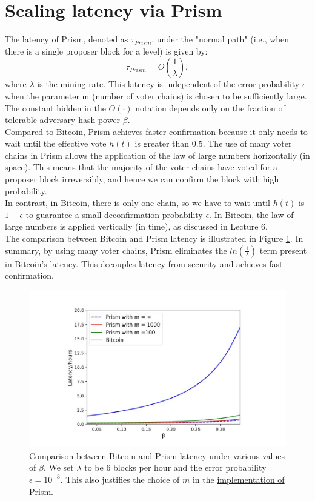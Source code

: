 \documentclass{report}
\begin{document}
\section{Scaling latency via Prism}
The latency of Prism, denoted as $\tau_{Prism}$, under the "normal path" (i.e., when there is a single proposer block for a level) is given by:\\
\begin{equation*}
	\tau_{Prism} = O(\frac{1}{\lambda}),
\end{equation*}
where $\lambda$ is the mining rate. This latency is independent of the error probability $\epsilon$ when the parameter m (number of voter chains) is chosen to be sufficiently large. The constant hidden in the $O(·)$ notation depends only on the fraction of tolerable adversary hash power $\beta$.\\
Compared to Bitcoin, Prism achieves faster confirmation because it only needs to wait until the effective vote $h(t)$ is greater than $0.5$. The use of many voter chains in Prism allows the application of the law of large numbers horizontally (in space). This means that the majority of the voter chains have voted for a proposer block irreversibly, and hence we can confirm the block with high probability.\\
In contrast, in Bitcoin, there is only one chain, so we have to wait until $h(t)$ is $1 - \epsilon$ to guarantee a small deconfirmation probability $\epsilon$. In Bitcoin, the law of large numbers is applied vertically (in time), as discussed in Lecture 6.\\
The comparison between Bitcoin and Prism latency is illustrated in Figure \ref{fig:f6}. In summary, by using many voter chains, Prism eliminates the $ln(\frac{1}{\lambda})$ term present in Bitcoin's latency. This decouples latency from security and achieves fast confirmation.
\begin{center}
	\begin{figure}
		\centering
		\includegraphics[width=0.8\linewidth]{Fig/F6}
		\caption{Comparison between Bitcoin and Prism latency under various values of $\beta$. We set $\lambda$ to be 6 blocks per hour and the error probability $\epsilon = 10^{−3}$. This also justifies the choice of $m$ in the \href{https://arxiv.org/abs/1909.11261}{implementation of Prism}.}
		\label{fig:f6}
	\end{figure}
\end{center}
\end{document}
